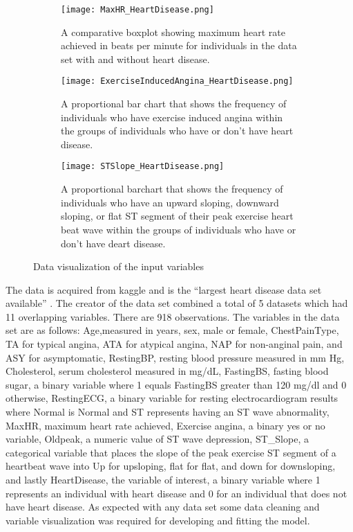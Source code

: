 \documentclass[12pt]{article}
\begin{document}
\begin{figure}
   \begin{subfigure}[b]{0.3\textwidth}
       \centering
       \texttt{[image: MaxHR\_HeartDisease.png]}
       \caption{A comparative boxplot showing maximum heart rate achieved in beats per minute for individuals in the data set with and without heart disease.}
       \label{fig:maxHR_heartdisease}
   \end{subfigure}
   \hfill
   \begin{subfigure}[b]{0.3\textwidth}
       \centering
       \texttt{[image: ExerciseInducedAngina\_HeartDisease.png]}
       \caption{A proportional bar chart that shows the frequency of individuals who have exercise induced angina within the groups of individuals who have or don't have heart disease.}
       \label{fig:EIA_heartdisease}
   \end{subfigure}
   \hfill
   \begin{subfigure}[b]{0.3\textwidth}
       \centering
       \texttt{[image: STSlope\_HeartDisease.png]}
       \caption{A proportional barchart that shows the frequency of individuals who have an upward sloping, downward sloping, or flat ST segment of their peak exercise heart beat wave within the groups of individuals who have or don't have deart disease.}
       \label{fig:STslope_heartdisease}
   \end{subfigure}
      \caption{Data visualization of the input variables}
      \label{fig:datavis}
\end{figure}
The data is acquired from kaggle and is the “largest heart disease data set available” \citep*{CitekeyMisc}. The creator of the data set combined a total of 5 datasets which had 11 overlapping variables. There are 918 observations. The variables in the data set are as follows: Age,measured in years, sex, male or female, ChestPainType, TA for typical angina, ATA for atypical angina, NAP for non-anginal pain, and ASY for asymptomatic, RestingBP, resting blood pressure measured in mm Hg, Cholesterol, serum cholesterol measured in mg/dL, FastingBS, fasting blood sugar, a binary variable where 1 equals FastingBS greater than 120 mg/dl and 0 otherwise, RestingECG, a binary variable for resting electrocardiogram results where Normal is Normal and ST represents having an ST wave abnormality, MaxHR, maximum heart rate achieved, Exercise angina, a binary yes or no variable, Oldpeak, a numeric value of ST wave depression, ST\_Slope, a categorical variable that places the slope of the peak exercise ST segment of a heartbeat wave into Up for upsloping, flat for flat, and down for downsloping, and lastly HeartDisease, the variable of interest, a binary variable where 1 represents an individual with heart disease and 0 for an individual that does not have heart disease. As expected with any data set some data cleaning and variable visualization was required for developing and fitting the model. \par
\end{document}
